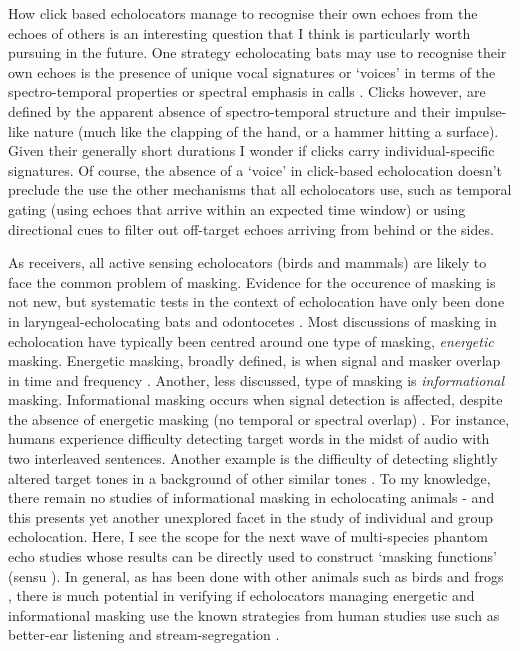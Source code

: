 \documentclass[
]{book}
\begin{document}
How click based echolocators manage to recognise their own echoes from the echoes of others is an interesting question that I think is particularly worth pursuing in the future. One strategy echolocating bats may use to recognise their own echoes is the presence of unique vocal signatures or `voices' in terms of the spectro-temporal properties or spectral emphasis in calls \citep{yovel2009voice, masters1995sonar}. Clicks however, are defined by the apparent absence of spectro-temporal structure \citep{pye1980echolocation} and their impulse-like nature (much like the clapping of the hand, or a hammer hitting a surface). Given their generally short durations I wonder if clicks carry individual-specific signatures. Of course, the absence of a `voice' in click-based echolocation doesn't preclude the use the other mechanisms that all echolocators use, such as temporal gating (using echoes that arrive within an expected time window) or using directional cues to filter out off-target echoes arriving from behind or the sides.

As receivers, all active sensing echolocators (birds and mammals) are likely to face the common problem of masking. Evidence for the occurence of masking is not new, but systematic tests in the context of echolocation have only been done in laryngeal-echolocating bats and odontocetes \citep{Nachtigall2014}. Most discussions of masking in echolocation have typically been centred around one type of masking, \emph{energetic} masking. Energetic masking, broadly defined, is when signal and masker overlap in time and frequency \citep{yost2007a, Culling2017}. Another, less discussed, type of masking is \emph{informational} masking. Informational masking occurs when signal detection is affected, despite the absence of energetic masking (no temporal or spectral overlap) \citep{Culling2017}. For instance, humans experience difficulty detecting target words in the midst of audio with two interleaved sentences. Another example is the difficulty of detecting slightly altered target tones in a background of other similar tones \citep{Kidd2017}. To my knowledge, there remain no studies of informational masking in echolocating animals - and this presents yet another unexplored facet in the study of individual and group echolocation. Here, I see the scope for the next wave of multi-species phantom echo studies \citep[eg.][]{m1989a, surlykke1992target, surlykke1996integration, siewert2004a} whose results can be directly used to construct `masking functions' (sensu \citet{beleyur2019modeling}). In general, as has been done with other animals such as birds and frogs \citep{bee2008a}, there is much potential in verifying if echolocators managing energetic and informational masking use the known strategies from human studies use such as better-ear listening and stream-segregation \citep{Culling2017}.
\end{document}
